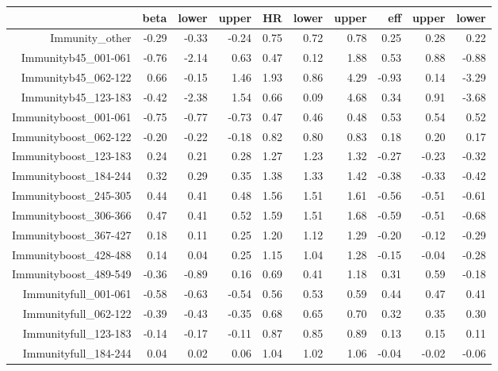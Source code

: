 \begin{table}[ht]
\centering
\begin{tabular}{rrrrrrrrrr}
  \hline
 & beta & lower & upper & HR & lower & upper & eff & upper & lower \\ 
  \hline
Immunity\_other & -0.29 & -0.33 & -0.24 & 0.75 & 0.72 & 0.78 & 0.25 & 0.28 & 0.22 \\ 
  Immunityb45\_001-061 & -0.76 & -2.14 & 0.63 & 0.47 & 0.12 & 1.88 & 0.53 & 0.88 & -0.88 \\ 
  Immunityb45\_062-122 & 0.66 & -0.15 & 1.46 & 1.93 & 0.86 & 4.29 & -0.93 & 0.14 & -3.29 \\ 
  Immunityb45\_123-183 & -0.42 & -2.38 & 1.54 & 0.66 & 0.09 & 4.68 & 0.34 & 0.91 & -3.68 \\ 
  Immunityboost\_001-061 & -0.75 & -0.77 & -0.73 & 0.47 & 0.46 & 0.48 & 0.53 & 0.54 & 0.52 \\ 
  Immunityboost\_062-122 & -0.20 & -0.22 & -0.18 & 0.82 & 0.80 & 0.83 & 0.18 & 0.20 & 0.17 \\ 
  Immunityboost\_123-183 & 0.24 & 0.21 & 0.28 & 1.27 & 1.23 & 1.32 & -0.27 & -0.23 & -0.32 \\ 
  Immunityboost\_184-244 & 0.32 & 0.29 & 0.35 & 1.38 & 1.33 & 1.42 & -0.38 & -0.33 & -0.42 \\ 
  Immunityboost\_245-305 & 0.44 & 0.41 & 0.48 & 1.56 & 1.51 & 1.61 & -0.56 & -0.51 & -0.61 \\ 
  Immunityboost\_306-366 & 0.47 & 0.41 & 0.52 & 1.59 & 1.51 & 1.68 & -0.59 & -0.51 & -0.68 \\ 
  Immunityboost\_367-427 & 0.18 & 0.11 & 0.25 & 1.20 & 1.12 & 1.29 & -0.20 & -0.12 & -0.29 \\ 
  Immunityboost\_428-488 & 0.14 & 0.04 & 0.25 & 1.15 & 1.04 & 1.28 & -0.15 & -0.04 & -0.28 \\ 
  Immunityboost\_489-549 & -0.36 & -0.89 & 0.16 & 0.69 & 0.41 & 1.18 & 0.31 & 0.59 & -0.18 \\ 
  Immunityfull\_001-061 & -0.58 & -0.63 & -0.54 & 0.56 & 0.53 & 0.59 & 0.44 & 0.47 & 0.41 \\ 
  Immunityfull\_062-122 & -0.39 & -0.43 & -0.35 & 0.68 & 0.65 & 0.70 & 0.32 & 0.35 & 0.30 \\ 
  Immunityfull\_123-183 & -0.14 & -0.17 & -0.11 & 0.87 & 0.85 & 0.89 & 0.13 & 0.15 & 0.11 \\ 
  Immunityfull\_184-244 & 0.04 & 0.02 & 0.06 & 1.04 & 1.02 & 1.06 & -0.04 & -0.02 & -0.06 \\ 

\end{tabular}
\end{table}
